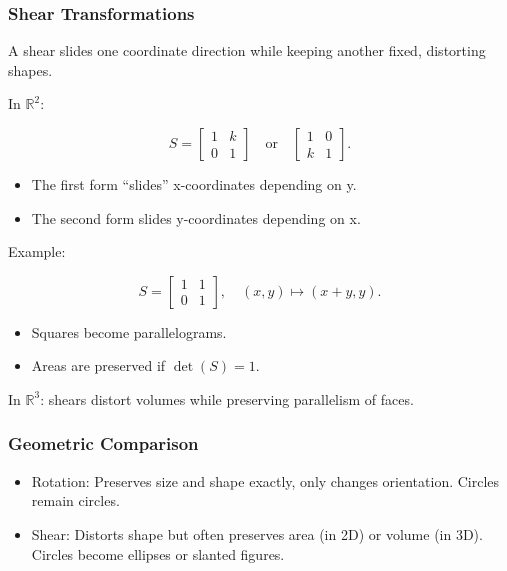 \documentclass[
  letterpaper,
  DIV=11,
  numbers=noendperiod]{scrreprt}
\providecommand{\tightlist}{%
  \setlength{\itemsep}{0pt}\setlength{\parskip}{0pt}}
\begin{document}
\subsubsection{Shear Transformations}\label{shear-transformations}

A shear slides one coordinate direction while keeping another fixed,
distorting shapes.

In \(\mathbb{R}^2\):

\[
S = \begin{bmatrix} 1 & k \\ 0 & 1 \end{bmatrix} \quad \text{or} \quad \begin{bmatrix} 1 & 0 \\ k & 1 \end{bmatrix}.
\]

\begin{itemize}
\tightlist
\item
  The first form ``slides'' x-coordinates depending on y.
\item
  The second form slides y-coordinates depending on x.
\end{itemize}

Example:

\[
S = \begin{bmatrix} 1 & 1 \\ 0 & 1 \end{bmatrix}, \quad (x,y) \mapsto (x+y, y).
\]

\begin{itemize}
\tightlist
\item
  Squares become parallelograms.
\item
  Areas are preserved if \(\det(S) = 1\).
\end{itemize}

In \(\mathbb{R}^3\): shears distort volumes while preserving parallelism
of faces.

\subsubsection{Geometric Comparison}\label{geometric-comparison}

\begin{itemize}
\tightlist
\item
  Rotation: Preserves size and shape exactly, only changes orientation.
  Circles remain circles.
\item
  Shear: Distorts shape but often preserves area (in 2D) or volume (in
  3D). Circles become ellipses or slanted figures.
\end{itemize}
\end{document}
